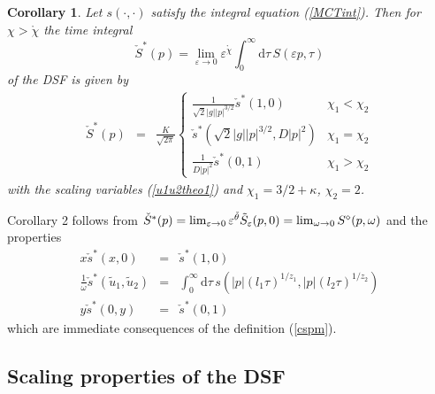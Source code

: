 \documentclass[12pt]{article}
\newcommand{\rmd}{\mathrm{d}}
\newtheorem{corollary}[theorem]{Corollary}
\begin{document}
\begin{corollary}
\label{Coro:2}
Let $s (\cdot,\cdot)$ 
satisfy the integral equation (\ref{MCTint}).
Then for $\chi > \mathring{\chi}$ the time integral \begin{equation}
\check{S}^{\ast}(p) = 
\lim_{\varepsilon \to 0} \varepsilon^{\mathring{\chi}}
\int_0^\infty \rmd \tau \, 
S(\varepsilon p, \tau)
\end{equation}
of the DSF is given by
\begin{eqnarray}
\check{S}^{\ast}(p) 
& = & 
 \frac{K}{\sqrt{2\pi}} 
\left\{\begin{array}{ll} \frac{1}{\sqrt{2}|g| |p|^{3/2}} \check{s}^\ast(1,0) & \chi_1 < \chi_2  \\[2mm]
\check{s}^\ast(\sqrt{2}|g| |p|^{3/2}, D |p|^{2}) & \chi_1 = \chi_2  \\[2mm]
\frac{1}{D |p|^{2}}  \check{s}^\ast(0,1) & \chi_1 > \chi_2 
\end{array} \right. 
\label{DSFcoro2}
\end{eqnarray}
with the scaling variables (\ref{u1u2theo1})
and $\chi_1=3/2+\kappa$, $\chi_2 = 2$. 
\end{corollary}

Corollary 2 follows from 
$\check{S}^{\ast}(p) 
= \lim_{\varepsilon \to 0} \varepsilon^{\mathring{\theta}}
\tilde{S}_{\varepsilon}(p, 0) \\
= \lim_{\omega \to 0} S^{\diamond}(p,\omega) $
and the properties
\begin{eqnarray}
x \check{s}^\ast(x,0) & = & \check{s}^\ast(1,0) \\
\frac{1}{\omega} \check{s}^\ast(\tilde{u}_1,\tilde{u}_2) & = &  \int_{0}^\infty \rmd \tau \, s (|p| (l_1 \tau)^{1/z_1}, |p|
(l_2 \tau)^{1/z_2}) \\
y \check{s}^\ast(0,y) & = & \check{s}^\ast(0,1)
\end{eqnarray} 
which are immediate consequences of the definition
(\ref{cspm}).

\subsection{Scaling properties of the DSF}
\end{document}

